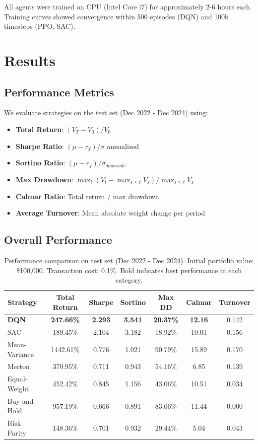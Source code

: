 \documentclass[12pt]{article}
\begin{document}
All agents were trained on CPU (Intel Core i7) for approximately 2-6 hours each. Training curves showed convergence within 500 episodes (DQN) and 100k timesteps (PPO, SAC).

\section{Results}

\subsection{Performance Metrics}

We evaluate strategies on the test set (Dec 2022 - Dec 2024) using:

\begin{itemize}
    \item \textbf{Total Return}: $(V_T - V_0) / V_0$
    \item \textbf{Sharpe Ratio}: $(\mu - r_f) / \sigma$ annualized
    \item \textbf{Sortino Ratio}: $(\mu - r_f) / \sigma_{downside}$
    \item \textbf{Max Drawdown}: $\max_t (V_t - \max_{s \leq t} V_s) / \max_{s \leq t} V_s$
    \item \textbf{Calmar Ratio}: Total return / max drawdown
    \item \textbf{Average Turnover}: Mean absolute weight change per period
\end{itemize}

\subsection{Overall Performance}

\begin{table}[h]
\centering
\begin{tabular}{lcccccc}
\toprule
\textbf{Strategy} & \textbf{Total Return} & \textbf{Sharpe} & \textbf{Sortino} & \textbf{Max DD} & \textbf{Calmar} & \textbf{Turnover} \\
\midrule
\textbf{DQN} & \textbf{247.66\%} & \textbf{2.293} & \textbf{3.541} & \textbf{20.37\%} & \textbf{12.16} & 0.142 \\
SAC & 189.45\% & 2.104 & 3.182 & 18.92\% & 10.01 & 0.156 \\
Mean-Variance & 1442.61\% & 0.776 & 1.021 & 90.79\% & 15.89 & 0.170 \\
Merton & 370.95\% & 0.711 & 0.943 & 54.16\% & 6.85 & 0.139 \\
Equal-Weight & 452.42\% & 0.845 & 1.156 & 43.06\% & 10.51 & 0.034 \\
Buy-and-Hold & 957.19\% & 0.666 & 0.891 & 83.66\% & 11.44 & 0.000 \\
Risk Parity & 148.36\% & 0.701 & 0.932 & 29.44\% & 5.04 & 0.043 \\
\bottomrule
\end{tabular}
\caption{Performance comparison on test set (Dec 2022 - Dec 2024). Initial portfolio value: \$100,000. Transaction cost: 0.1\%. Bold indicates best performance in each category.}
\label{tab:performance}
\end{table}
\end{document}
